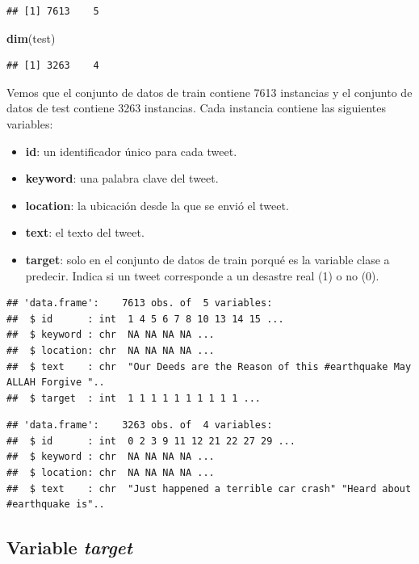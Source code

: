 \documentclass[]{article}
\newenvironment{Shaded}{\begin{snugshade}}{\end{snugshade}}
\newcommand{\KeywordTok}[1]{\textcolor[rgb]{0.13,0.29,0.53}{\textbf{#1}}}
\newcommand{\NormalTok}[1]{#1}
\providecommand{\tightlist}{%
  \setlength{\itemsep}{0pt}\setlength{\parskip}{0pt}}
\begin{document}
\begin{verbatim}
## [1] 7613    5
\end{verbatim}

\begin{Shaded}
\begin{Highlighting}[]
\KeywordTok{dim}\NormalTok{(test)}
\end{Highlighting}
\end{Shaded}

\begin{verbatim}
## [1] 3263    4
\end{verbatim}

Vemos que el conjunto de datos de train contiene 7613 instancias y el
conjunto de datos de test contiene 3263 instancias. Cada instancia
contiene las siguientes variables:

\begin{itemize}
\tightlist
\item
  \textbf{id}: un identificador único para cada tweet.
\item
  \textbf{keyword}: una palabra clave del tweet.
\item
  \textbf{location}: la ubicación desde la que se envió el tweet.
\item
  \textbf{text}: el texto del tweet.
\item
  \textbf{target}: solo en el conjunto de datos de train porqué es la
  variable clase a predecir. Indica si un tweet corresponde a un
  desastre real (1) o no (0).
\end{itemize}

\begin{verbatim}
## 'data.frame':    7613 obs. of  5 variables:
##  $ id      : int  1 4 5 6 7 8 10 13 14 15 ...
##  $ keyword : chr  NA NA NA NA ...
##  $ location: chr  NA NA NA NA ...
##  $ text    : chr  "Our Deeds are the Reason of this #earthquake May ALLAH Forgive "..
##  $ target  : int  1 1 1 1 1 1 1 1 1 1 ...
\end{verbatim}

\begin{verbatim}
## 'data.frame':    3263 obs. of  4 variables:
##  $ id      : int  0 2 3 9 11 12 21 22 27 29 ...
##  $ keyword : chr  NA NA NA NA ...
##  $ location: chr  NA NA NA NA ...
##  $ text    : chr  "Just happened a terrible car crash" "Heard about #earthquake is"..
\end{verbatim}

\hypertarget{variable-target}{%
\subsection{\texorpdfstring{Variable
\emph{target}}{Variable target}}\label{variable-target}}
\end{document}
